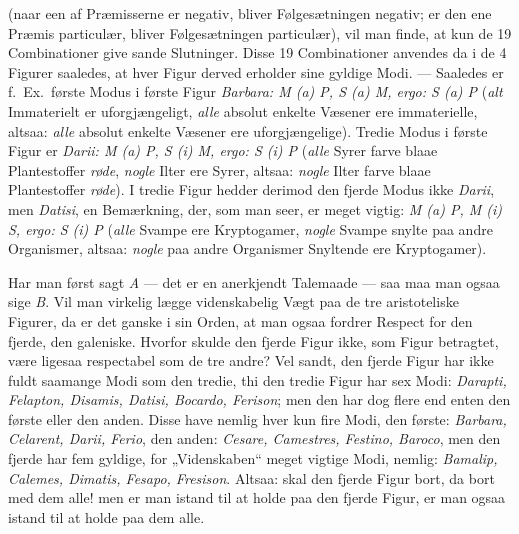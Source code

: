 \documentclass[12pt]{book}
\begin{document}
{(naar een af Præmisserne er negativ, bliver Følgesætningen negativ; er den ene Præmis particulær, bliver Følgesætningen particulær), vil man finde, at kun de 19 Combinationer give sande Slutninger. Disse 19 Combinationer anvendes da i de 4 Figurer saaledes, at hver Figur derved erholder sine gyldige Modi. --- Saaledes er f.\ Ex.\ første Modus i første Figur \textit{Barbara: M (a) P, S (a) M, ergo: S (a) P} (\emph{alt} Immaterielt er uforgjængeligt, \emph{alle} absolut enkelte Væsener ere immaterielle, altsaa: \emph{alle} absolut enkelte Væsener ere uforgjængelige). Tredie Modus i første Figur er \textit{Darii: M (a) P, S (i) M, ergo: S (i) P} (\emph{alle} Syrer farve blaae Plantestoffer \emph{røde}, \emph{nogle} Ilter ere Syrer, altsaa: \emph{nogle} Ilter farve %
blaae Plantestoffer \emph{røde}). I tredie Figur hedder derimod den fjerde Modus ikke \textit{Darii}, men \textit{Datisi}, en Bemærkning, der, som man seer, er meget vigtig: \textit{M (a) P, M (i) S, ergo: S (i) P} (\emph{alle} Svampe ere Kryptogamer, \emph{nogle} Svampe snylte paa andre Organismer, altsaa: \emph{nogle} paa andre Organismer Snyltende ere Kryptogamer).

Har man først sagt \textit{A} --- det er en anerkjendt Talemaade --- saa maa man ogsaa sige \textit{B}. Vil man virkelig lægge videnskabelig Vægt paa de tre aristoteliske Figurer, da er det ganske i sin Orden, at man ogsaa fordrer Respect for den fjerde, den galeniske. Hvorfor skulde den fjerde Figur ikke, som Figur betragtet, være ligesaa respectabel som de tre andre? Vel sandt, den fjerde Figur har ikke fuldt saamange Modi som den tredie, thi den tredie Figur har sex Modi: \textit{Darapti, Felapton, Disamis, Datisi, Bocardo, Ferison}; men den har dog flere end enten den første eller den anden. Disse have nemlig hver kun fire Modi, den første: \textit{Barbara, Celarent, Darii, Ferio}, den anden: \textit{Cesare, Camestres, Festino, Baroco}, men den fjerde har fem gyldige, for „Videnskaben“ meget vigtige Modi, nemlig: \textit{Bamalip, Calemes, Dimatis, Fesapo, Fresison}. Altsaa: skal den fjerde Figur bort, da bort med dem alle! men er man istand til at holde paa den fjerde Figur, er man ogsaa istand til at holde paa dem alle.

}
\end{document}
